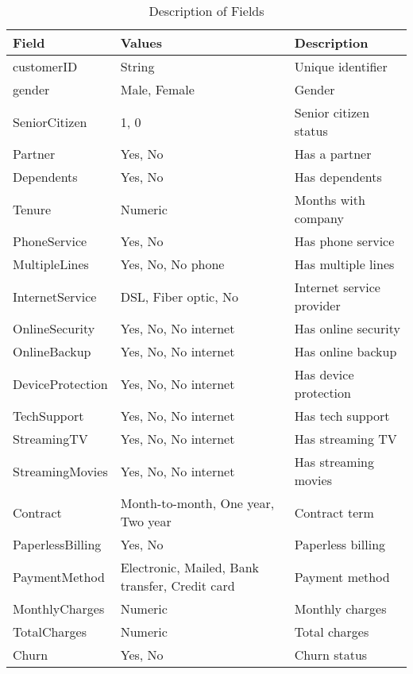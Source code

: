 \documentclass{article}
\begin{document}
\begin{table}[ht]
\centering
\begin{tabular}{|l|l|l|}
  \hline
\textbf{Field} & \textbf{Values} & \textbf{Description} \\
\hline
customerID & String & Unique identifier \\
gender & Male, Female & Gender \\
SeniorCitizen & 1, 0 & Senior citizen status \\
Partner & Yes, No & Has a partner \\
Dependents & Yes, No & Has dependents \\
Tenure & Numeric & Months with company \\
PhoneService & Yes, No & Has phone service \\
MultipleLines & Yes, No, No phone & Has multiple lines \\
InternetService & DSL, Fiber optic, No & Internet service provider \\
OnlineSecurity & Yes, No, No internet & Has online security \\
OnlineBackup & Yes, No, No internet & Has online backup \\
DeviceProtection & Yes, No, No internet & Has device protection \\
TechSupport & Yes, No, No internet & Has tech support \\
StreamingTV & Yes, No, No internet & Has streaming TV \\
StreamingMovies & Yes, No, No internet & Has streaming movies \\
Contract & Month-to-month, One year, Two year & Contract term \\
PaperlessBilling & Yes, No & Paperless billing \\
PaymentMethod & Electronic, Mailed, Bank transfer, Credit card & Payment method \\
MonthlyCharges & Numeric & Monthly charges \\
TotalCharges & Numeric & Total charges \\
Churn & Yes, No & Churn status \\
\hline
\end{tabular}
\caption{Description of Fields}
\end{table}
\end{document}
